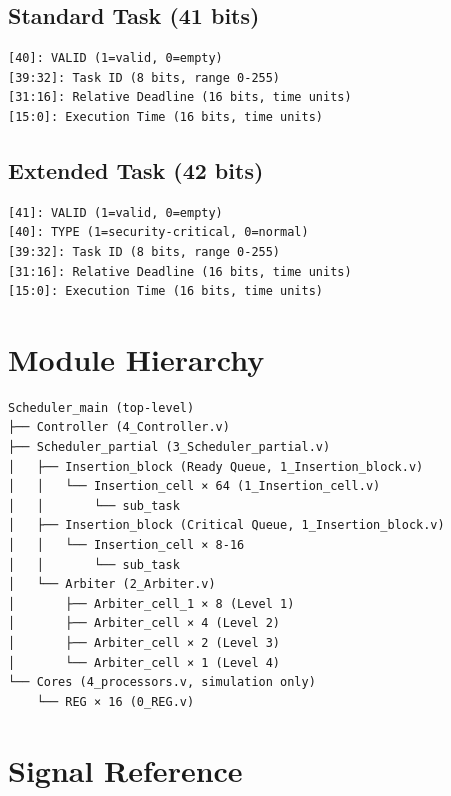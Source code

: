 \documentclass[12pt,a4paper]{article}
\begin{document}
\subsection{Standard Task (41 bits)}
\begin{verbatim}
[40]: VALID (1=valid, 0=empty)
[39:32]: Task ID (8 bits, range 0-255)
[31:16]: Relative Deadline (16 bits, time units)
[15:0]: Execution Time (16 bits, time units)
\end{verbatim}

\subsection{Extended Task (42 bits)}
\begin{verbatim}
[41]: VALID (1=valid, 0=empty)
[40]: TYPE (1=security-critical, 0=normal)
[39:32]: Task ID (8 bits, range 0-255)
[31:16]: Relative Deadline (16 bits, time units)
[15:0]: Execution Time (16 bits, time units)
\end{verbatim}

\section{Module Hierarchy}

\begin{verbatim}
Scheduler_main (top-level)
├── Controller (4_Controller.v)
├── Scheduler_partial (3_Scheduler_partial.v)
│   ├── Insertion_block (Ready Queue, 1_Insertion_block.v)
│   │   └── Insertion_cell × 64 (1_Insertion_cell.v)
│   │       └── sub_task
│   ├── Insertion_block (Critical Queue, 1_Insertion_block.v)
│   │   └── Insertion_cell × 8-16
│   │       └── sub_task
│   └── Arbiter (2_Arbiter.v)
│       ├── Arbiter_cell_1 × 8 (Level 1)
│       ├── Arbiter_cell × 4 (Level 2)
│       ├── Arbiter_cell × 2 (Level 3)
│       └── Arbiter_cell × 1 (Level 4)
└── Cores (4_processors.v, simulation only)
    └── REG × 16 (0_REG.v)
\end{verbatim}

\section{Signal Reference}
\end{document}
